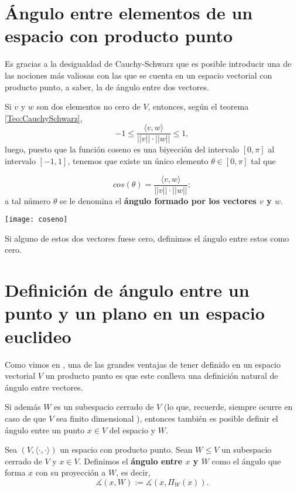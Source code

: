 
\section{Ángulo entre elementos de un espacio con producto punto}

Es gracias a la desigualdad de Cauchy-Schwarz
que es posible introducir una de las nociones
más valiosas con las que se cuenta en un espacio
vectorial con producto punto, a saber, la de ángulo entre dos
vectores.

Si $v$ y $w$ son dos elementos no cero de $V$, entonces,
según el teorema \ref{Teo:CauchySchwarz},
\[
-1 \leq \frac{\langle v, w \rangle}{||v|| \cdot ||w||} \leq 1,
\]
luego, puesto que la función coseno es una biyección
del intervalo $[0, \pi]$ al intervalo $[-1,1]$,
tenemos que existe un único elemento 
$\theta \in [0, \pi]$ tal que

\[
cos(\theta)= \frac{\langle v, w \rangle}{||v|| \cdot ||w||};
\]
a tal número $\theta$ se le denomina el 
\textbf{ángulo formado por los vectores $v$ y $w$}.

\begin{marginfigure}
\texttt{[image: coseno]}
\end{marginfigure}

Si alguno de estos dos vectores fuese cero, definimos
el ángulo entre estos como cero. 




\section{Definición de ángulo entre un punto y un plano en un espacio euclideo}

Como vimos en , una de las grandes ventajas de tener
definido en un espacio vectorial $V$ un producto punto es
que este conlleva una definición natural de ángulo entre
vectores.

Si además $W$ es un subespacio cerrado de $V$
(lo que, recuerde, siempre ocurre en caso de que
$V$ sea finito dimensional ), entonces también
es posible definir el ángulo entre un punto $x \in V$
del espacio y $W$.

\begin{defi} \label{def: angulo punto subespacio}
Sea $(V, \langle \cdot , \cdot \rangle)$ un espacio con 
producto punto. Sean $W \leq V$ un subespacio cerrado de $V$
y $x \in V$. Definimos el \textbf{ángulo entre $x$ y $W$}
como el ángulo que forma 
$x$ con su proyección a $W$, es decir,
\[
\measuredangle (x, W):= \measuredangle(x, \Pi_{W}(x)).
\]
\end{defi}

